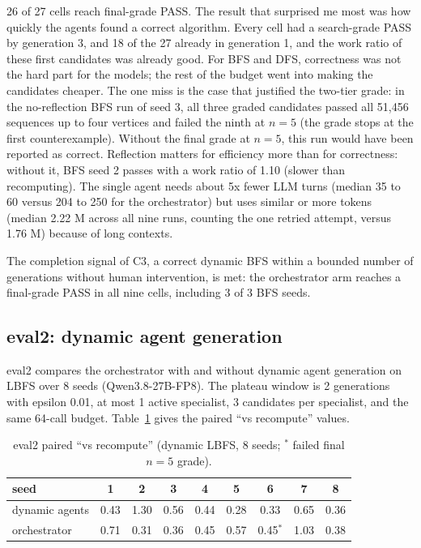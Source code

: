 26 of 27 cells reach final-grade PASS. The result that surprised me most was
how quickly the agents found a correct algorithm. Every cell had a search-grade
PASS by generation 3, and 18 of the 27 already in generation 1, and the work
ratio of these first candidates was already good. For BFS and DFS, correctness
was not the hard part for the models; the rest of the budget went into making
the candidates cheaper. The one miss is the case that justified the two-tier
grade: in the no-reflection BFS run of seed 3, all three graded candidates passed
all 51{,}456 sequences up to four vertices and failed the ninth at $n = 5$
(the grade stops at the first counterexample).
Without the final grade at $n = 5$, this run would have been reported as
correct. Reflection matters for efficiency more than for correctness:
without it, BFS seed 2 passes with a work ratio of 1.10 (slower than
recomputing). The single agent needs about 5x fewer LLM turns (median 35 to 60
versus 204 to 250 for the orchestrator) but uses similar or more tokens
(median 2.22 M across all nine runs, counting the one retried attempt, versus
1.76 M) because of long contexts.

The completion signal of C3, a correct dynamic BFS within a bounded number of
generations without human intervention, is met: the orchestrator arm reaches a
final-grade PASS in all nine cells, including 3 of 3 BFS seeds.

\subsection{eval2: dynamic agent generation}

eval2 compares the orchestrator with and without dynamic agent generation on
LBFS over 8 seeds (Qwen3.8-27B-FP8). The plateau window is 2 generations with
epsilon 0.01, at most 1 active specialist, 3 candidates per specialist, and the
same 64-call budget. Table~\ref{tab:eval2} gives the paired ``vs recompute''
values.

\begin{table}[H]
\centering
\footnotesize
\caption{eval2 paired ``vs recompute'' (dynamic LBFS, 8 seeds; $^*$ failed final $n=5$ grade).}
\label{tab:eval2}
\begin{tabular}{@{}lcccccccc@{}}
\toprule
seed & 1 & 2 & 3 & 4 & 5 & 6 & 7 & 8 \\
\midrule
dynamic agents & 0.43 & 1.30 & 0.56 & 0.44 & 0.28 & 0.33 & 0.65 & 0.36 \\
orchestrator   & 0.71 & 0.31 & 0.36 & 0.45 & 0.57 & 0.45$^*$ & 1.03 & 0.38 \\
\bottomrule
\end{tabular}
\end{table}

